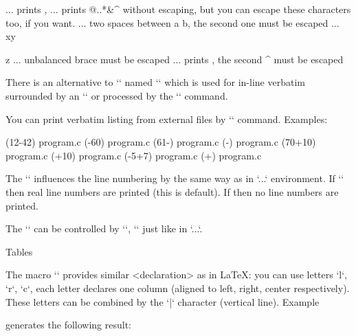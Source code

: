 \begtt
\code{\\text, \%\#} ... prints \text, %
  ... prints @{..}*&^$ $ without escaping, but you can
                        escape these characters too, if you want.
        ... two spaces between a  b, the second one must be escaped
        ... xy{z ... unbalanced brace must be escaped
         ... prints ^^M, the second ^ must be escaped
\endtt

There is an alternative to `\tthook` named `\intthook` which is used for
in-line verbatim surrounded by an `\activettchar` or processed by the `\code`
command.

You can print verbatim listing from external files by `\verbinput` command. 
Examples:

\begtt
\verbinput (12-42) program.c  %
\verbinput (-60) program.c    % print from begin to the line 60
\verbinput (61-) program.c    % from line 61 to the end
\verbinput (-) program.c      % whole file is printed
\verbinput (70+10) program.c  % from line 70, only 10 lines printed
\verbinput (+10) program.c    % from the last line read, print 10 lines 
\vebrinput (-5+7) program.c   %
\verbinput (+) program.c      % from the last line read to the end
\endtt


The `\ttline` influences the line numbering by the same way as in
`\begtt...\endtt` environment. If `` then real line numbers are
printed (this is default). If  then no line 
numbers are printed.

The `\verbinput` can be controlled by `\tthook`, `\ttindent` just like
in `\begtt...\endtt`.


\sec Tables

The macro `` provides similar <declaration>
as in \LaTeX: you can use letters `l`, `r`, `c`, each letter declares 
one column (aligned to left, right, center respectively). 
These letters can be combined by the `|` character (vertical line). Example

\begtt
{}
\endtt
%
generates the following result:

\bigskip
\hfil{}
\bigskip

}
